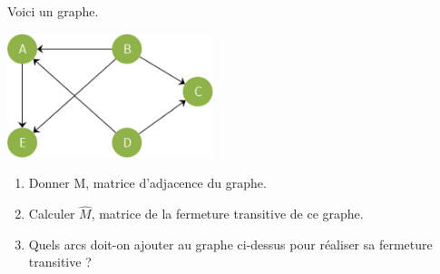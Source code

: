 \begin{exercice}[]
    Voici un graphe.
    \begin{center}
        \includegraphics[width=6cm]{graphes/img/exo_dm.png}
    \end{center}
    \begin{enumerate}
        \item 	Donner M, matrice d'adjacence du graphe.
        \item 	Calculer $\widehat{M}$, matrice de la fermeture transitive de ce graphe.
        \item 	Quels arcs doit-on ajouter au graphe ci-dessus pour réaliser sa fermeture transitive ?
    \end{enumerate}
\end{exercice}

